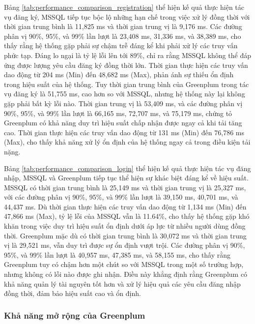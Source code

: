 Bảng \ref{tab:performance_comparison_registration} thể hiện kế quả thực hiện   tác vụ đăng ký, MSSQL tiếp tục bộc lộ những hạn chế trong việc xử lý đồng thời với thời gian trung bình là 11,825 ms và thời gian trung vị là 9,176 ms. Các đường phân vị 90\%, 95\%, và 99\% lần lượt là 23,408 ms, 31,336 ms, và 38,389 ms, cho thấy rằng hệ thống gặp phải sự chậm trễ đáng kể khi phải xử lý các truy vấn phức tạp. Đáng lo ngại là tỷ lệ lỗi lên tới 89\%, chỉ ra rằng MSSQL không thể đáp ứng được lượng yêu cầu đăng ký đồng thời lớn. Thời gian thực hiện các truy vấn dao động từ 204 ms (Min) đến 48,682 ms (Max), phản ánh sự thiếu ổn định trong hiệu suất của hệ thống. Tuy thời gian trung bình của Greenplum trong tác vụ đăng ký là 51,755 ms, cao hơn so với MSSQL, nhưng hệ thống này lại không gặp phải bất kỳ lỗi nào. Thời gian trung vị là 53,409 ms, và các đường phân vị 90\%, 95\%, và 99\% lần lượt là 66,165 ms, 72,707 ms, và 75,179 ms, chứng tỏ Greenplum có khả năng duy trì hiệu suất chấp nhận được ngay cả khi tải tăng cao. Thời gian thực hiện các truy vấn dao động từ 131 ms (Min) đến 76,786 ms (Max), cho thấy khả năng xử lý ổn định của hệ thống ngay cả trong điều kiện tải nặng.

Bảng \ref{tab:performance_comparison_login} thể hiện kế quả thực hiện  tác vụ đăng nhập, MSSQL và Greenplum tiếp tục thể hiện sự khác biệt đáng kể về hiệu suất. MSSQL có thời gian trung bình là 25,149 ms và thời gian trung vị là 25,327 ms, với các đường phân vị 90\%, 95\%, và 99\% lần lượt là 39,150 ms, 40,701 ms, và 44,437 ms. Dù thời gian thực hiện các truy vấn dao động từ 1,134 ms (Min) đến 47,866 ms (Max), tỷ lệ lỗi của MSSQL vẫn là 11.64\%, cho thấy hệ thống gặp khó khăn trong việc duy trì hiệu suất ổn định dưới áp lực từ nhiều người dùng đồng thời. Greenplum mặc dù có thời gian trung bình là 30,072 ms và thời gian trung vị là 29,521 ms, vẫn duy trì được sự ổn định vượt trội. Các đường phân vị 90\%, 95\%, và 99\% lần lượt là 40,957 ms, 47,385 ms, và 58,155 ms, cho thấy rằng Greenplum tuy có chậm hơn một chút so với MSSQL trong một số trường hợp, nhưng không có lỗi nào được ghi nhận. Điều này khẳng định rằng Greenplum có khả năng quản lý tài nguyên tốt hơn và xử lý hiệu quả các yêu cầu đăng nhập đồng thời, đảm bảo hiệu suất cao và ổn định.


\subsubsection{Khả năng mở rộng của Greenplum}

